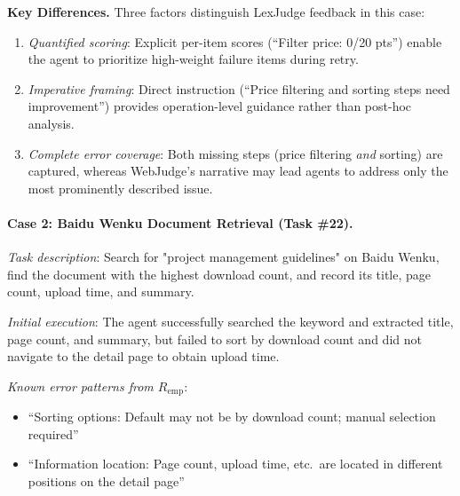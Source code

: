 \textbf{Key Differences.} Three factors distinguish LexJudge feedback in this case:
\begin{enumerate}[leftmargin=*, nosep]
    \item \textit{Quantified scoring}: Explicit per-item scores (``Filter price: 0/20 pts'') enable the agent to prioritize high-weight failure items during retry.
    \item \textit{Imperative framing}: Direct instruction (``Price filtering and sorting steps need improvement'') provides operation-level guidance rather than post-hoc analysis.
    \item \textit{Complete error coverage}: Both missing steps (price filtering \textit{and} sorting) are captured, whereas WebJudge's narrative may lead agents to address only the most prominently described issue.
\end{enumerate}

\vspace{1em}
\paragraph{Case 2: Baidu Wenku Document Retrieval (Task \#22).}

\textit{Task description}: Search for "project management guidelines" on Baidu Wenku, find the document with the highest download count, and record its title, page count, upload time, and summary.

\textit{Initial execution}: The agent successfully searched the keyword and extracted title, page count, and summary, but failed to sort by download count and did not navigate to the detail page to obtain upload time.

\textit{Known error patterns from $R_{\text{emp}}$}:
\begin{itemize}[leftmargin=*, nosep]
    \item ``Sorting options: Default may not be by download count; manual selection required''
    \item ``Information location: Page count, upload time, etc.\ are located in different positions on the detail page''
\end{itemize}

